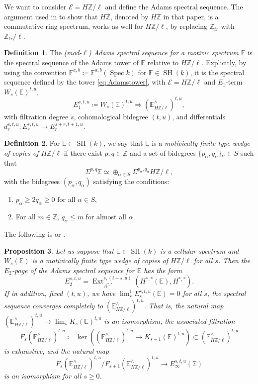 \documentclass[10pt]{amsart}
\theoremstyle{definition}
\newtheorem{defn}{Definition}[section]
\theoremstyle{plain}
\newtheorem{prop}[defn]{Proposition}
\numberwithin{equation}{section}
\newcommand{\0}{\emptyset}
\newcommand{\sE}{{\mathcal E}}
\newcommand{\E}{{\mathbb E}}
\newcommand{\F}{{\mathbb F}}
\newcommand{\Z}{{\mathbb Z}}
\newcommand{\Spec}{{\operatorname{Spec}}}
\newcommand{\SH}{{\operatorname{SH}}}
\newcommand{\Ext}{{\operatorname{Ext}}}
\begin{document}
We want to consider $\sE=H\Z/\ell$ and define the Adams spectral sequence. The argument used in \cite[Example 3.4]{DunRon:Functors} to show that $H\Z$, denoted by $H\Z$ in that paper, is a commutative ring spectrum, works as well for $H\Z/\ell$, by replacing $\Z_{tr}$ with $\Z_{tr}/\ell$. 

\begin{defn}
    The \emph{(mod-$\ell$) Adams spectral sequence for a motivic spectrum $\E$} is the spectral sequence of the Adams tower of $\E$ relative to $H\Z/\ell$. Explicitly, by using the convention $\F^{a,b}\coloneqq \F^{a,b}(\Spec k)$ for $\F \in \SH(k)$, it is the spectral sequence defined by the tower \eqref{eq:Adamstower}, with $\sE=H\Z/\ell$ and $E_1$-term $W_s(\E)^{t,u}$,
    $$E_1^{s,t,u} \coloneqq W_s(\E)^{t,u} \Rightarrow (\E_{H\Z/\ell}^\wedge)^{t,u},$$
    with filtration degree $s$, cohomological bidegree $(t,u)$, and differentials $d_r^{s,t,u}:E_r^{s,t,u} \to E_r^{s+r,t+1,u}$.
\end{defn}

\begin{defn}
\label{defn:WedgeOfCopiesHZ}
    For $\E \in \SH(k)$, we say that $\E$ is a \emph{motivically finite type wedge of copies of $H\Z/\ell$} if there exist $p,q \in \Z$ and a set of bidegrees $\{p_\alpha,q_\alpha\}{_\alpha\in S}$ such that 
    $$\Sigma^{p,q}\E \simeq \oplus_{\alpha \in S} \Sigma^{p_\alpha,q_\alpha} H\Z/\ell,$$
    with the bidegrees $(p_\alpha,q_\alpha)$ satisfying the conditions:
    \begin{enumerate}
        \item $p_\alpha \ge 2q_\alpha \ge 0$ for all $\alpha \in S$,
        \item For all $m \in \Z$, $q_\alpha \le m$ for almost all $\alpha$.
    \end{enumerate}
\end{defn}

The following is \cite[Proposition 6.6]{lev:ellcoh} or \cite[Remark 6.11 and Proposition 6.14]{DugIsa:Adams}.

\begin{prop}
\label{prop:a.s.s}
    Let us suppose that $\E \in \SH(k)$ is a cellular spectrum and $W_s(\E)$ is a motivically finite type wedge of copies of $H\Z/\ell$ for all $s$. Then the $E_2$-page of the Adams spectral sequence for $\E$ has the form
    $$E_2^{s,t,u}= \Ext_{A^{*,*}}^{s,(t-s,u)}(H^{*,*}(\E),H^{*,*}).$$
    If in addition, fixed $(t,u)$, we have $\lim_r^1 E_r^{s,t,u}(\E)=0$ for all $s$, the spectral sequence converges completely to $(\E_{H\Z/\ell}^\wedge)^{t,u}$. That is, the natural map $(\E_{H\Z/\ell}^\wedge)^{t,u} \to \lim_s K_s(\E)^{t,u}$ is an isomorphism, the associated filtration
    $$F_s(\E_{H\Z/\ell}^\wedge)^{t,u} \coloneqq \ker((\E_{H\Z/\ell}^\wedge)^{t,u} \to K_{s-1}(\E)^{t,u}) \subset (\E_{H\Z/\ell}^\wedge)^{t,u}$$
    is exhaustive, and the natural map
    $$F_s(\E_{H\Z/\ell}^\wedge)^{t,u} / F_{s+1}(\E_{H\Z/\ell}^\wedge)^{t,u} \to E_\infty^{s,t,u}(\E)$$
    is an isomorphism for all $s \ge 0$.
\end{prop}
\end{document}
